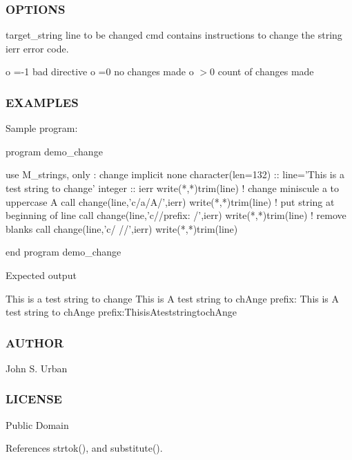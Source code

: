 \subsubsection*{O\+P\+T\+I\+O\+NS}

target\+\_\+string line to be changed cmd contains instructions to change the string ierr error code.

o =-\/1 bad directive o =0 no changes made o $>$0 count of changes made

\subsubsection*{E\+X\+A\+M\+P\+L\+ES}

Sample program\+:

program demo\+\_\+change \begin{DoxyVerb}use M_strings, only : change
implicit none
character(len=132) :: line='This is a test string to change'
integer            :: ierr
   write(*,*)trim(line)
   ! change miniscule a to uppercase A
   call change(line,'c/a/A/',ierr)
   write(*,*)trim(line)
   ! put string at beginning of line
   call change(line,'c//prefix: /',ierr)
   write(*,*)trim(line)
   ! remove blanks
   call change(line,'c/ //',ierr)
   write(*,*)trim(line)
\end{DoxyVerb}
 end program demo\+\_\+change

Expected output \begin{DoxyVerb} This is a test string to change
 This is A test string to chAnge
 prefix: This is A test string to chAnge
 prefix:ThisisAteststringtochAnge
\end{DoxyVerb}
 \subsubsection*{A\+U\+T\+H\+OR}

John S. Urban \subsubsection*{L\+I\+C\+E\+N\+SE}

Public Domain 

References strtok(), and substitute().

